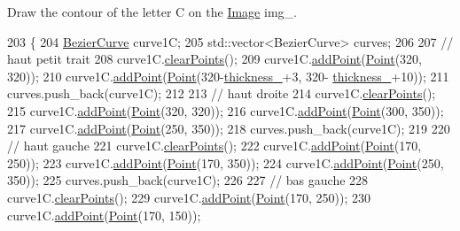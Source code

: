 Draw the contour of the letter C on the \mbox{\hyperlink{class_image}{Image}} img\+\_\+. 


\begin{DoxyCode}
203                \{
204     \mbox{\hyperlink{class_bezier_curve}{BezierCurve}} curve1C;
205     std::vector<BezierCurve> curves;
206 
207     \textcolor{comment}{// haut petit trait}
208     curve1C.\mbox{\hyperlink{class_bezier_curve_a0ba8ce66d5af5971ae6a1b506029728e}{clearPoints}}();
209     curve1C.\mbox{\hyperlink{class_bezier_curve_a38d16c18b36ae45619b05e26e226cf34}{addPoint}}(\mbox{\hyperlink{class_point}{Point}}(320, 320));
210     curve1C.\mbox{\hyperlink{class_bezier_curve_a38d16c18b36ae45619b05e26e226cf34}{addPoint}}(\mbox{\hyperlink{class_point}{Point}}(320-\mbox{\hyperlink{class_font_v1_aed8040e76be9a52833627b92f0fb4e5f}{thickness\_}}+3, 320-
      \mbox{\hyperlink{class_font_v1_aed8040e76be9a52833627b92f0fb4e5f}{thickness\_}}+10));
211     curves.push\_back(curve1C);
212     
213     \textcolor{comment}{// haut droite}
214     curve1C.\mbox{\hyperlink{class_bezier_curve_a0ba8ce66d5af5971ae6a1b506029728e}{clearPoints}}();
215     curve1C.\mbox{\hyperlink{class_bezier_curve_a38d16c18b36ae45619b05e26e226cf34}{addPoint}}(\mbox{\hyperlink{class_point}{Point}}(320, 320));
216     curve1C.\mbox{\hyperlink{class_bezier_curve_a38d16c18b36ae45619b05e26e226cf34}{addPoint}}(\mbox{\hyperlink{class_point}{Point}}(300, 350));
217     curve1C.\mbox{\hyperlink{class_bezier_curve_a38d16c18b36ae45619b05e26e226cf34}{addPoint}}(\mbox{\hyperlink{class_point}{Point}}(250, 350));
218     curves.push\_back(curve1C);
219 
220     \textcolor{comment}{// haut gauche}
221     curve1C.\mbox{\hyperlink{class_bezier_curve_a0ba8ce66d5af5971ae6a1b506029728e}{clearPoints}}();
222     curve1C.\mbox{\hyperlink{class_bezier_curve_a38d16c18b36ae45619b05e26e226cf34}{addPoint}}(\mbox{\hyperlink{class_point}{Point}}(170, 250));
223     curve1C.\mbox{\hyperlink{class_bezier_curve_a38d16c18b36ae45619b05e26e226cf34}{addPoint}}(\mbox{\hyperlink{class_point}{Point}}(170, 350));
224     curve1C.\mbox{\hyperlink{class_bezier_curve_a38d16c18b36ae45619b05e26e226cf34}{addPoint}}(\mbox{\hyperlink{class_point}{Point}}(250, 350));
225     curves.push\_back(curve1C);
226 
227     \textcolor{comment}{// bas gauche}
228     curve1C.\mbox{\hyperlink{class_bezier_curve_a0ba8ce66d5af5971ae6a1b506029728e}{clearPoints}}();
229     curve1C.\mbox{\hyperlink{class_bezier_curve_a38d16c18b36ae45619b05e26e226cf34}{addPoint}}(\mbox{\hyperlink{class_point}{Point}}(170, 250));
230     curve1C.\mbox{\hyperlink{class_bezier_curve_a38d16c18b36ae45619b05e26e226cf34}{addPoint}}(\mbox{\hyperlink{class_point}{Point}}(170, 150));

\end{DoxyCode}
